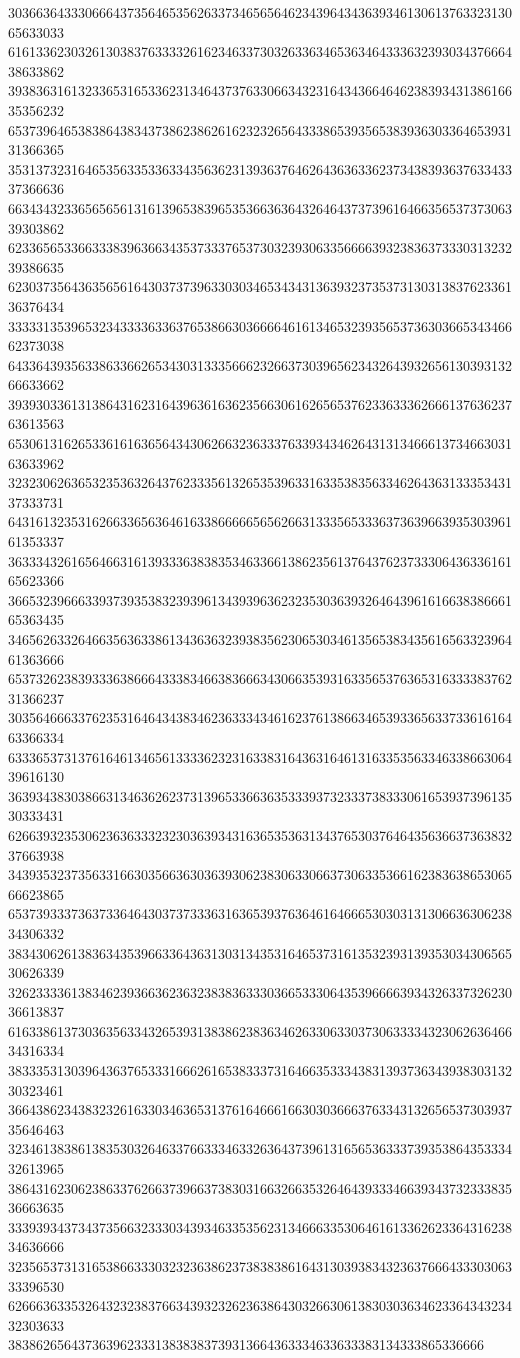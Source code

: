 30366364333066643735646535626337346565646234396434363934613061376332313065633033
61613362303261303837633332616234633730326336346536346433363239303437666438633862
39383631613233653165336231346437376330663432316434366464623839343138616635356232
65373964653838643834373862386261623232656433386539356538393630336465393131366365
35313732316465356335336334356362313936376462643636336237343839363763343337366636
66343432336565656131613965383965353663636432646437373961646635653737306339303862
62336565336633383963663435373337653730323930633566663932383637333031323239386635
62303735643635656164303737396330303465343431363932373537313031383762336136376434
33333135396532343333633637653866303666646161346532393565373630366534346662373038
64336439356338633662653430313335666232663730396562343264393265613039313266633662
39393033613138643162316439636163623566306162656537623363336266613763623763613563
65306131626533616163656434306266323633376339343462643131346661373466303163633962
32323062636532353632643762333561326535396331633538356334626436313335343137333731
64316132353162663365636461633866666565626631333565333637363966393530396161353337
36333432616564663161393336383835346336613862356137643762373330643633616165623366
36653239666339373935383239396134393963623235303639326464396161663838666165363435
34656263326466356363386134363632393835623065303461356538343561656332396461363666
65373262383933363866643338346638366634306635393163356537636531633338376231366237
30356466633762353164643438346236333434616237613866346539336563373361616463366334
63336537313761646134656133336232316338316436316461316335356334633866306439616130
36393438303866313463626237313965336636353339373233373833306165393739613530333431
62663932353062363633323230363934316365353631343765303764643563663736383237663938
34393532373563316630356636303639306238306330663730633536616238363865306566623865
65373933373637336464303737333631636539376364616466653030313130663630623834306332
38343062613836343539663364363130313435316465373161353239313935303430656530626339
32623333613834623936636236323838363330366533306435396666393432633732623036613837
61633861373036356334326539313838623836346263306330373063333432306263646634316334
38333531303964363765333166626165383337316466353334383139373634393830313230323461
36643862343832326163303463653137616466616630303666376334313265653730393735646463
32346138386138353032646337663334633263643739613165653633373935386435333432613965
38643162306238633762663739663738303166326635326464393334663934373233383536663635
33393934373437356632333034393463353562313466633530646161336262336431623834636666
32356537313165386633303232363862373838386164313039383432363766643330306333396530
62666363353264323238376634393232623638643032663061383030363462336434323432303633
38386265643736396233313838383739313664363334633633383134333865336666
